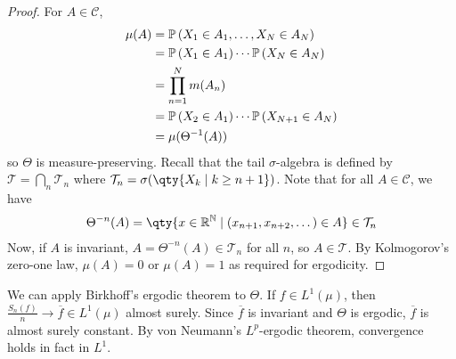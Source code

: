 \begin{proof}
	For $A \in \mathcal C$,
	\begin{align*}
			\mu(A) &= \mathbb{P}\left({X_1 \in A_1, \dots, X_N \in A_N}\right) \\
			&= \mathbb{P}\left({X_1 \in A_1}\right) \cdots \mathbb{P}\left({X_N \in A_N}\right) \\
			&= \prod_{n=1}^N m(A_n) \\
			&= \mathbb{P}\left({X_2 \in A_1}\right) \cdots \mathbb{P}\left({X_{N+1} \in A_N}\right) \\
			&= \mu(\Theta^{-1}(A))
	\end{align*}
	so $\Theta$ is measure-preserving.
	Recall that the tail $\sigma$-algebra is defined by $\mathcal T = \bigcap_n \mathcal T_n$ where $\mathcal T_n = \sigma(\qty{X_k \mid k \geq n + 1})$.
	Note that for all $A \in \mathcal C$, we have
	\begin{align*}
        \Theta^{-n}(A) = \qty{x \in \mathbb R^{\mathbb N} \mid (x_{n+1}, x_{n+2}, \dots) \in A} \in \mathcal T_n
    \end{align*}
	Now, if $A$ is invariant, $A = \Theta^{-n}(A) \in \mathcal T_n$ for all $n$, so $A \in \mathcal T$.
	By Kolmogorov's zero-one law, $\mu(A) = 0$ or $\mu(A) = 1$ as required for ergodicity.
\end{proof}
We can apply Birkhoff's ergodic theorem to $\Theta$.
If $f \in L^1(\mu)$, then $\frac{S_n(f)}{n} \to \overline f \in L^1(\mu)$ almost surely.
Since $\overline f$ is invariant and $\Theta$ is ergodic, $\overline f$ is almost surely constant.
By von Neumann's $L^p$-ergodic theorem, convergence holds in fact in $L^1$.

